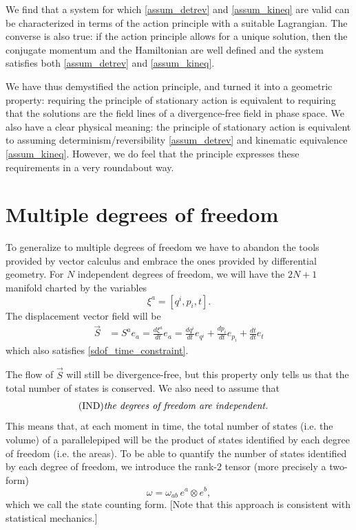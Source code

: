 \documentclass[fleqn,10pt]{wlscirep}
\begin{document}
We find that a system for which \ref{assum_detrev} and \ref{assum_kineq} are valid can be characterized in terms of the action principle with a suitable Lagrangian. The converse is also true: if the action principle allows for a unique solution, then the conjugate momentum and the Hamiltonian are well defined and the system satisfies both \ref{assum_detrev} and \ref{assum_kineq}.

We have thus demystified the action principle, and turned it into a geometric property: requiring the principle of stationary action is equivalent to requiring that the solutions are the field lines of a divergence-free field in phase space. We also have a clear physical meaning: the principle of stationary action is equivalent to assuming determinism/reversibility \ref{assum_detrev} and kinematic equivalence \ref{assum_kineq}. However, we do feel that the principle expresses these requirements in a very roundabout way.

\section*{Multiple degrees of freedom}

To generalize to multiple degrees of freedom we have to abandon the tools provided by vector calculus and embrace the ones provided by differential geometry. For $N$ independent degrees of freedom, we will have the $2N+1$ manifold charted by the variables
\begin{equation}\label{mdof_variables}
	\xi^a = [ q^i, p_i, t].
\end{equation}
The displacement vector field will be
\begin{equation}\label{mdof_displacement}
	\begin{aligned}
		\vec{S} &= S^a e_a = \frac{d\xi^a}{dt} e_a =\frac{dq^i}{dt} e_{q^i} + \frac{dp_i}{dt} e_{p_i} + \frac{dt}{dt} e_t
	\end{aligned}
\end{equation}
which also satisfies \ref{sdof_time_constraint}.

The flow of $\vec{S}$ will still be divergence-free, but this property only tells us that the total number of states is conserved. We also need to assume that
\begin{align}\label{assum_indep}
	\tag*{(IND)}
	\parbox{2.8in}{\emph{the degrees of freedom are independent.}}
\end{align}
This means that, at each moment in time, the total number of states (i.e. the volume) of a parallelepiped will be the product of states identified by each degree of freedom (i.e. the areas). To be able to quantify the number of states identified by each degree of freedom, we introduce the rank-2 tensor (more precisely a two-form)
\begin{equation}\label{mdof_form}
	\omega = \omega_{ab} \, e^a \otimes e^b,
\end{equation}
which we call the state counting form. [Note that this approach is consistent with statistical mechanics\cite{peliti2011statistical}.]
\end{document}
